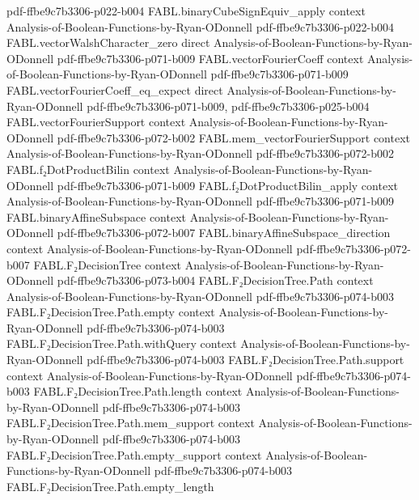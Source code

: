 \begin{theorem}
  {pdf-ffbe9c7b3306-p022-b004}
\proofstep
  {FABL.binaryCubeSignEquiv_apply}
  {context}
  {Analysis-of-Boolean-Functions-by-Ryan-ODonnell}
  {pdf-ffbe9c7b3306-p022-b004}
\proofstep
  {FABL.vectorWalshCharacter_zero}
  {direct}
  {Analysis-of-Boolean-Functions-by-Ryan-ODonnell}
  {pdf-ffbe9c7b3306-p071-b009}
\proofstep
  {FABL.vectorFourierCoeff}
  {context}
  {Analysis-of-Boolean-Functions-by-Ryan-ODonnell}
  {pdf-ffbe9c7b3306-p071-b009}
\proofstep
  {FABL.vectorFourierCoeff_eq_expect}
  {direct}
  {Analysis-of-Boolean-Functions-by-Ryan-ODonnell}
  {pdf-ffbe9c7b3306-p071-b009,
    pdf-ffbe9c7b3306-p025-b004}
\proofstep
  {FABL.vectorFourierSupport}
  {context}
  {Analysis-of-Boolean-Functions-by-Ryan-ODonnell}
  {pdf-ffbe9c7b3306-p072-b002}
\proofstep
  {FABL.mem_vectorFourierSupport}
  {context}
  {Analysis-of-Boolean-Functions-by-Ryan-ODonnell}
  {pdf-ffbe9c7b3306-p072-b002}
\proofstep
  {FABL.f₂DotProductBilin}
  {context}
  {Analysis-of-Boolean-Functions-by-Ryan-ODonnell}
  {pdf-ffbe9c7b3306-p071-b009}
\proofstep
  {FABL.f₂DotProductBilin_apply}
  {context}
  {Analysis-of-Boolean-Functions-by-Ryan-ODonnell}
  {pdf-ffbe9c7b3306-p071-b009}
\proofstep
  {FABL.binaryAffineSubspace}
  {context}
  {Analysis-of-Boolean-Functions-by-Ryan-ODonnell}
  {pdf-ffbe9c7b3306-p072-b007}
\proofstep
  {FABL.binaryAffineSubspace_direction}
  {context}
  {Analysis-of-Boolean-Functions-by-Ryan-ODonnell}
  {pdf-ffbe9c7b3306-p072-b007}
\proofstep
  {FABL.F₂DecisionTree}
  {context}
  {Analysis-of-Boolean-Functions-by-Ryan-ODonnell}
  {pdf-ffbe9c7b3306-p073-b004}
\proofstep
  {FABL.F₂DecisionTree.Path}
  {context}
  {Analysis-of-Boolean-Functions-by-Ryan-ODonnell}
  {pdf-ffbe9c7b3306-p074-b003}
\proofstep
  {FABL.F₂DecisionTree.Path.empty}
  {context}
  {Analysis-of-Boolean-Functions-by-Ryan-ODonnell}
  {pdf-ffbe9c7b3306-p074-b003}
\proofstep
  {FABL.F₂DecisionTree.Path.withQuery}
  {context}
  {Analysis-of-Boolean-Functions-by-Ryan-ODonnell}
  {pdf-ffbe9c7b3306-p074-b003}
\proofstep
  {FABL.F₂DecisionTree.Path.support}
  {context}
  {Analysis-of-Boolean-Functions-by-Ryan-ODonnell}
  {pdf-ffbe9c7b3306-p074-b003}
\proofstep
  {FABL.F₂DecisionTree.Path.length}
  {context}
  {Analysis-of-Boolean-Functions-by-Ryan-ODonnell}
  {pdf-ffbe9c7b3306-p074-b003}
\proofstep
  {FABL.F₂DecisionTree.Path.mem_support}
  {context}
  {Analysis-of-Boolean-Functions-by-Ryan-ODonnell}
  {pdf-ffbe9c7b3306-p074-b003}
\proofstep
  {FABL.F₂DecisionTree.Path.empty_support}
  {context}
  {Analysis-of-Boolean-Functions-by-Ryan-ODonnell}
  {pdf-ffbe9c7b3306-p074-b003}
\proofstep
  {FABL.F₂DecisionTree.Path.empty_length}

\end{theorem}
